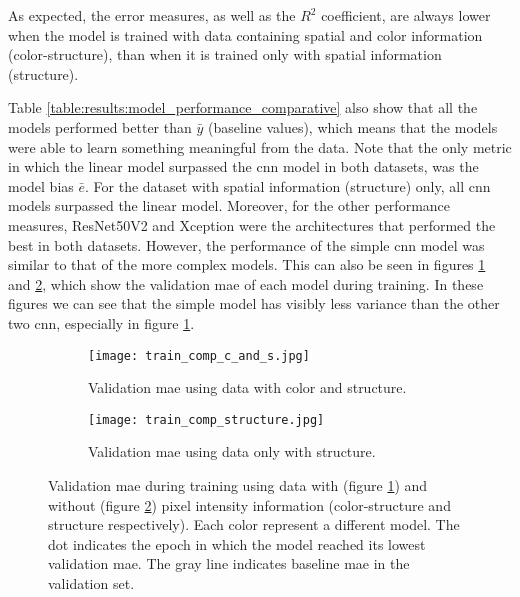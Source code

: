 As expected, the error measures, as well as the $R^2$ coefficient, are always lower when the model is trained with data containing spatial and color information (color-structure), than when it is trained only with spatial information (structure).

Table \ref{table:results:model_performance_comparative} also show that all the models performed better than $\bar{y}$ (baseline values), which means that the models were able to learn something meaningful from the data.
Note that the only metric in which the linear model surpassed the \gls{cnn} model in both datasets, was the model bias $\bar{e}$.
For the dataset with spatial information (structure) only, all \gls{cnn} models surpassed the linear model.
Moreover, for the other performance measures, ResNet50V2 and Xception were the architectures that performed the best in both datasets.
However, the performance of the simple \gls{cnn} model was similar to that of the more complex models.
This can also be seen in figures \ref{fig:results:train_per_com:cs} and \ref{fig:results:train_per_com:s}, which show the validation \gls{mae} of each model during training.
In these figures we can see that the simple model has visibly less variance than the other two \gls{cnn}, especially in figure \ref{fig:results:train_per_com:cs}.

\begin{figure}[!ht]
  \centering
  \begin{subfigure}[b]{.9\linewidth}
    \texttt{[image: train\_comp\_c\_and\_s.jpg]}
    \caption{Validation \gls{mae} using data with color and structure.}
    \label{fig:results:train_per_com:cs}
  \end{subfigure}%
  \vspace{3mm}
  \begin{subfigure}[b]{.9\linewidth}
    \texttt{[image: train\_comp\_structure.jpg]}
    \caption{Validation \gls{mae} using data only with structure.}
    \label{fig:results:train_per_com:s}
  \end{subfigure}
  \caption{Validation \gls{mae} during training using data with (figure \ref{fig:results:train_per_com:cs}) and without (figure \ref{fig:results:train_per_com:s}) pixel intensity information (color-structure and structure respectively). Each color represent a different model. The dot indicates the epoch in which the model reached its lowest validation \gls{mae}. The gray line indicates baseline \gls{mae} in the validation set. }
  \label{fig:results:train_per_com}
\end{figure}

